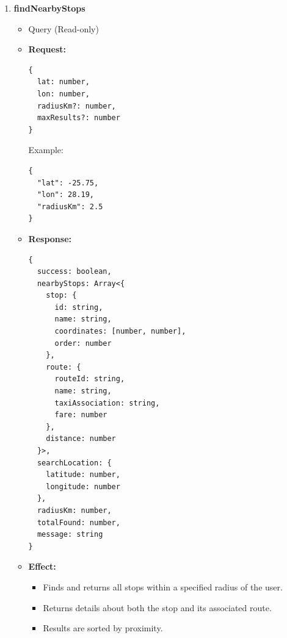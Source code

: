 \documentclass[a4paper,12pt]{article}
\begin{document}
\begin{enumerate}
  \item \textbf{findNearbyStops}
  \begin{itemize}
    \item Query (Read-only)
    \item \textbf{Request:}
    \begin{verbatim}
{
  lat: number,
  lon: number,
  radiusKm?: number,
  maxResults?: number
}
    \end{verbatim}
    Example:
    \begin{verbatim}
{
  "lat": -25.75,
  "lon": 28.19,
  "radiusKm": 2.5
}
    \end{verbatim}
    \item \textbf{Response:}
    \begin{verbatim}
{
  success: boolean,
  nearbyStops: Array<{
    stop: {
      id: string,
      name: string,
      coordinates: [number, number],
      order: number
    },
    route: {
      routeId: string,
      name: string,
      taxiAssociation: string,
      fare: number
    },
    distance: number
  }>,
  searchLocation: {
    latitude: number,
    longitude: number
  },
  radiusKm: number,
  totalFound: number,
  message: string
}
    \end{verbatim}
    \item \textbf{Effect:}
    \begin{itemize}
      \item Finds and returns all stops within a specified radius of the user.
      \item Returns details about both the stop and its associated route.
      \item Results are sorted by proximity.
    \end{itemize}
  \end{itemize}


\end{enumerate}
\end{document}
